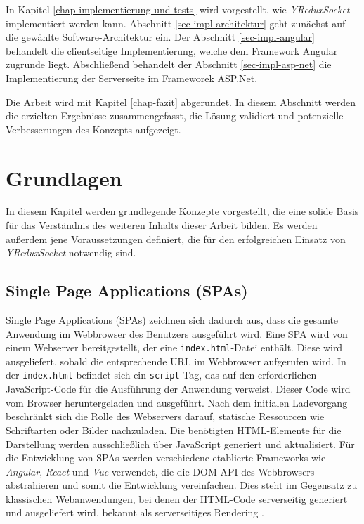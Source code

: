\documentclass[12pt]{book}          %
\begin{document}
In Kapitel \ref{chap-implementierung-und-tests} wird vorgestellt, wie \textit{YReduxSocket} implementiert werden kann. Abschnitt \ref{sec-impl-architektur} geht zunächst auf die gewählte Software-Architektur ein. Der Abschnitt \ref{sec-impl-angular} behandelt die clientseitige Implementierung, welche dem Framework Angular zugrunde liegt. Abschließend behandelt der Abschnitt \ref{sec-impl-asp-net} die Implementierung der Serverseite im Frameworek ASP.Net.

Die Arbeit wird mit Kapitel \ref{chap-fazit} abgerundet. In diesem Abschnitt werden die erzielten Ergebnisse zusammengefasst, die Lösung validiert und potenzielle Verbesserungen des Konzepts aufgezeigt. 



\chapter{Grundlagen}
\label{chap-grundlagen}

In diesem Kapitel werden grundlegende Konzepte vorgestellt, die eine solide Basis für das Verständnis des weiteren Inhalts dieser Arbeit bilden. Es werden außerdem jene Voraussetzungen definiert, die für den erfolgreichen Einsatz von \textit{YReduxSocket} notwendig sind.

\section{Single Page Applications (SPAs)}
\label{sec-single-page-applications}

Single Page Applications (SPAs) zeichnen sich dadurch aus, dass die gesamte Anwendung im Webbrowser des Benutzers ausgeführt wird. Eine SPA wird von einem Webserver bereitgestellt, der eine \texttt{index.html}-Datei enthält. Diese wird ausgeliefert, sobald die entsprechende URL im Webbrowser aufgerufen wird. In der \texttt{index.html} befindet sich ein \texttt{script}-Tag, das auf den erforderlichen JavaScript-Code für die Ausführung der Anwendung verweist. Dieser Code wird vom Browser heruntergeladen und ausgeführt. Nach dem initialen Ladevorgang beschränkt sich die Rolle des Webservers darauf, statische Ressourcen wie Schriftarten oder Bilder nachzuladen. Die benötigten HTML-Elemente für die Darstellung werden ausschließlich über JavaScript generiert und aktualisiert. Für die Entwicklung von SPAs werden verschiedene etablierte Frameworks wie \textit{Angular}, \textit{React} und \textit{Vue} verwendet, die die DOM-API des Webbrowsers abstrahieren und somit die Entwicklung vereinfachen. Dies steht im Gegensatz zu klassischen Webanwendungen, bei denen der HTML-Code serverseitig generiert und ausgeliefert wird, bekannt als serverseitiges Rendering \cite[1]{hartmann_react_2020}.
\end{document}
